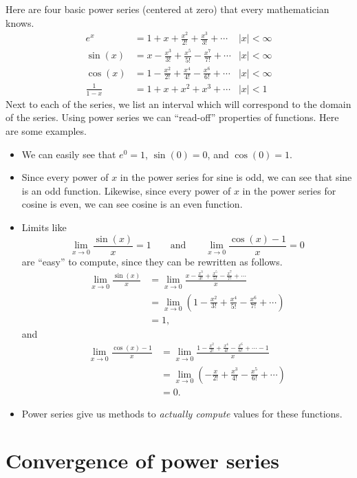 \documentclass{ximera}
\begin{document}
Here are four basic power series (centered at zero) that every
mathematician knows.  
\begin{align*}
           e^x &= 1 + x + \frac{x^2}{2!} + \frac{x^3}{3!} + \cdots &|x|< \infty\\
       \sin(x) &= x - \frac{x^3}{3!} + \frac{x^5}{5!} -\frac{x^7}{7!} + \cdots &|x|< \infty\\
       \cos(x) &= 1-\frac{x^2}{2!} + \frac{x^4}{4!} -\frac{x^6}{6!} + \cdots &|x|< \infty\\
 \frac{1}{1-x} &= 1+ x+ x^2 + x^3 + \cdots &|x|< 1
\end{align*}
Next to each of the series, we list an interval which will correspond
to the domain of the series.  Using power series we can ``read-off''
properties of functions. Here are some examples.
\begin{itemize}
\item We can easily see that $e^0 =1$, $\sin(0)=0$, and $\cos(0) =1$.
\item Since every power of $x$ in the power series for sine is odd, we
  can see that sine is an odd function. Likewise, since every power of
  $x$ in the power series for cosine is even, we can see cosine is an
  even function.
\item Limits like
  \[
  \lim_{x\to 0}\frac{\sin(x)}{x} = 1\qquad\text{and}\qquad \lim_{x\to 0} \frac{\cos(x)-1}{x} = 0
  \]
  are ``easy'' to compute, since they can be rewritten as follows.
  \begin{align*}
    \lim_{x\to 0}\frac{\sin(x)}{x} &=\lim_{x\to 0} \frac{x - \frac{x^3}{3!} + \frac{x^5}{5!} -\frac{x^7}{7!} + \cdots}{x}\\
    &=\lim_{x\to 0} \left(1 - \frac{x^2}{3!} + \frac{x^4}{5!} -\frac{x^6}{7!} + \cdots\right)\\
    &=1,
  \end{align*}
  and
  \begin{align*}
    \lim_{x\to 0} \frac{\cos(x)-1}{x}&=\lim_{x\to 0} \frac{1-\frac{x^2}{2!} + \frac{x^4}{4!} -\frac{x^6}{6!} + \cdots-1}{x}\\
    &=\lim_{x\to 0} \left(-\frac{x}{2!} + \frac{x^3}{4!} -\frac{x^5}{6!} + \cdots\right)\\
    &=0.
  \end{align*}
\item Power series give us methods to \textit{actually compute} values
  for these functions.
\end{itemize}

\section{Convergence of power series}
\end{document}
